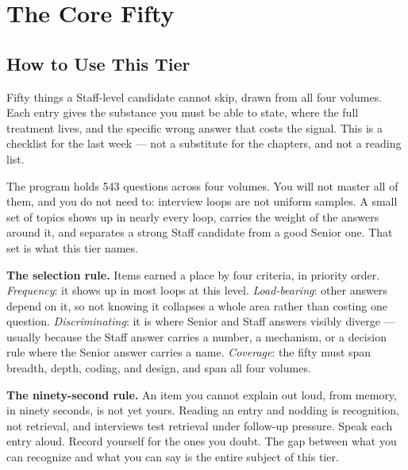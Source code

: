 
\chapter*{The Core Fifty}

\section*{How to Use This Tier}

\begin{tldr}
Fifty things a Staff-level candidate cannot skip, drawn from all four volumes. Each entry gives the substance you must be able to state, where the full treatment lives, and the specific wrong answer that costs the signal. This is a checklist for the last week --- not a substitute for the chapters, and not a reading list.
\end{tldr}

The program holds 543 questions across four volumes. You will not master all of them, and you do not need to: interview loops are not uniform samples. A small set of topics shows up in nearly every loop, carries the weight of the answers around it, and separates a strong Staff candidate from a good Senior one. That set is what this tier names.

\textbf{The selection rule.} Items earned a place by four criteria, in priority order. \emph{Frequency}: it shows up in most loops at this level. \emph{Load-bearing}: other answers depend on it, so not knowing it collapses a whole area rather than costing one question. \emph{Discriminating}: it is where Senior and Staff answers visibly diverge --- usually because the Staff answer carries a number, a mechanism, or a decision rule where the Senior answer carries a name. \emph{Coverage}: the fifty must span breadth, depth, coding, and design, and span all four volumes.

\textbf{The ninety-second rule.} An item you cannot explain out loud, from memory, in ninety seconds, is not yet yours. Reading an entry and nodding is recognition, not retrieval, and interviews test retrieval under follow-up pressure. Speak each entry aloud. Record yourself for the ones you doubt. The gap between what you can recognize and what you can say is the entire subject of this tier.

